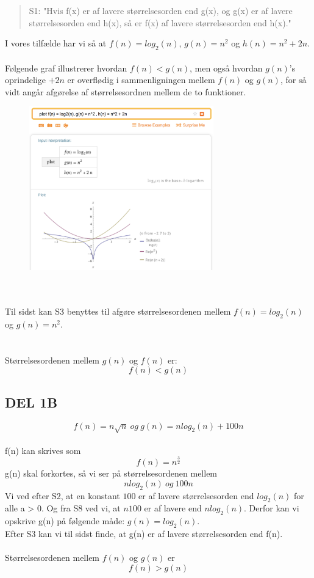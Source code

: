 \documentclass[a4paper]{article}
\begin{document}
\begin{quotation} \centering S1: "Hvis f(x) er af lavere størrelsesorden end g(x), og g(x) er af lavere størrelsesorden end h(x), så er f(x) af lavere størrelsesorden end h(x)."
\end{quotation}
I vores tilfælde har vi så at $f(n) = log_2(n)$, $g(n) = n^2$ og $h(n) = n^2 + 2n$. \\ \\ 
%
Følgende graf illustrerer hvordan $f(n) < g(n)$, men også hvordan $g(n)$'s oprindelige $+2n$ er overflødig
i sammenligningen mellem $f(n)$ og $g(n)$, for så vidt angår afgørelse af størrelsesordnen mellem
de to funktioner.
%
\begin{figure}[h]
\centering
\includegraphics[width=8cm]{del1a.png}
\end{figure} \\ \\
Til sidst kan S3 benyttes til afgøre
størrelsesordenen mellem $f(n) = log_2(n)$ og $g(n) = n^2$. \\ \\ \\
Størrelsesordenen mellem $g(n)$ og $f(n)$ er:
\[ f(n) < g(n) \]
%
%
\newpage
\subsection{DEL 1B}
\[ f(n) = n \sqrt{n} \ og \ g(n) = nlog_{2}(n) + 100n \] \\
%
f(n) kan skrives som 
\[ f(n) = n^{\frac{3}{2}} \]
g(n) skal forkortes, så vi ser på størrelsesordenen mellem
\[ nlog_{2}(n) \ og \ 100n \]
Vi ved efter S2, at en konstant $100$ er af lavere størrelsesorden end 
$log_{2}(n)$ for alle a > 0.
Og fra S8 ved vi, at $n100$ er af lavere end $nlog_{2}(n)$.
Derfor kan vi opskrive g(n) på følgende måde: $g(n) = log_{2}(n)$. \\
Efter S3 kan vi til sidst finde, at g(n) er af lavere størrelsesorden end f(n). \\ \\
Størrelsesordenen mellem $f(n)$ og $g(n)$ er \\
\[ f(n) > g(n) \]
\end{document}
